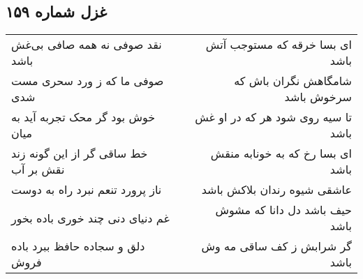 \begin{center}
\section*{غزل شماره ۱۵۹}
\label{sec:sh159}
\begin{longtable}{l p{0.5cm} r}
نقد صوفی نه همه صافی بی‌غش باشد
&&
ای بسا خرقه که مستوجب آتش باشد
\\
صوفی ما که ز ورد سحری مست شدی
&&
شامگاهش نگران باش که سرخوش باشد
\\
خوش بود گر محک تجربه آید به میان
&&
تا سیه روی شود هر که در او غش باشد
\\
خط ساقی گر از این گونه زند نقش بر آب
&&
ای بسا رخ که به خونابه منقش باشد
\\
ناز پرورد تنعم نبرد راه به دوست
&&
عاشقی شیوه رندان بلاکش باشد
\\
غم دنیای دنی چند خوری باده بخور
&&
حیف باشد دل دانا که مشوش باشد
\\
دلق و سجاده حافظ ببرد باده فروش
&&
گر شرابش ز کف ساقی مه وش باشد
\\
\end{longtable}
\end{center}
